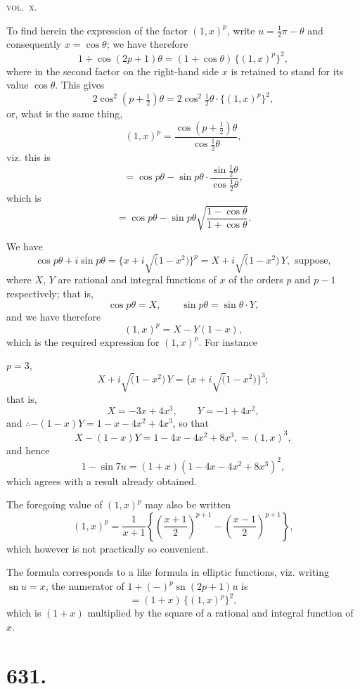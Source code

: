 \documentclass[12pt,a4paper]{article}
\theoremstyle{plain}
\theoremstyle{definition}
\theoremstyle{remark}
\newcommand{\sn}{\operatorname{sn}}
\begin{document}
\hfill\textsc{vol.~x.}

\clearpage
\setcounter{page}{2}

To find herein the expression of the factor $(1, x)^p$, write $u = \frac{1}{2}\pi - \theta$ and consequently $x = \cos\theta$; we have therefore
\[
1 + \cos(2p+1)\theta = (1+\cos\theta)\,\{(1, x)^p\}^2,
\]
where in the second factor on the right-hand side $x$ is retained to stand for its value $\cos\theta$. This gives
\[
2\cos^2\left(p+\tfrac{1}{2}\right)\theta = 2\cos^2\tfrac{1}{2}\theta \cdot \{(1, x)^p\}^2,
\]
or, what is the same thing,
\[
(1, x)^p = \frac{\cos(p+\frac{1}{2})\theta}{\cos\frac{1}{2}\theta},
\]
viz. this is
\[
= \cos p\theta - \sin p\theta \cdot \frac{\sin\frac{1}{2}\theta}{\cos\frac{1}{2}\theta},
\]
which is
\[
= \cos p\theta - \sin p\theta \sqrt{\frac{1-\cos\theta}{1+\cos\theta}}.
\]

We have
\[
\cos p\theta + i\sin p\theta = \{x + i\surd(1-x^2)\}^p = X + i\surd(1-x^2)\, Y, \text{ suppose},
\]
where $X$, $Y$ are rational and integral functions of $x$ of the orders $p$ and $p-1$ respectively; that is,
\[
\cos p\theta = X, \qquad \sin p\theta = \sin\theta \cdot Y,
\]
and we have therefore
\[
(1, x)^p = X - Y(1-x),
\]
which is the required expression for $(1, x)^p$. For instance

$p=3$,
\[
X + i\surd(1-x^2)\, Y = \{x + i\surd(1-x^2)\}^3;
\]
that is,
\[
X = -3x + 4x^3, \qquad Y = -1 + 4x^2,
\]
and $\therefore -(1-x)Y = 1 - x - 4x^2 + 4x^3$, so that
\[
X - (1-x)Y = 1 - 4x - 4x^2 + 8x^3, = (1, x)^3,
\]
and hence
\[
1 - \sin 7u = (1+x)(1 - 4x - 4x^2 + 8x^3)^2,
\]
which agrees with a result already obtained.

The foregoing value of $(1, x)^p$ may also be written
\[
(1, x)^p = \frac{1}{x+1} \left\{ \left( \frac{x+1}{2} \right)^{p+1} - \left( \frac{x-1}{2} \right)^{p+1} \right\},
\]
which however is not practically so convenient.

The formula corresponds to a like formula in elliptic functions, viz. writing $\sn u = x$, the numerator of $1 + (-)^p \sn(2p+1)u$ is
\[
= (1+x)\,\{(1, x)^p\}^2,
\]
which is $(1+x)$ multiplied by the square of a rational and integral function of $x$.

\clearpage
\setcounter{page}{3}

\section*{631.}
\end{document}

